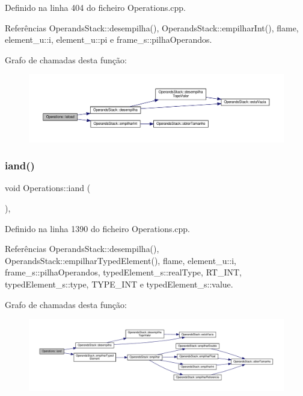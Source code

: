 Definido na linha 404 do ficheiro Operations.\+cpp.



Referências Operands\+Stack\+::desempilha(), Operands\+Stack\+::empilhar\+Int(), flame, element\+\_\+u\+::i, element\+\_\+u\+::pi e frame\+\_\+s\+::pilha\+Operandos.

Grafo de chamadas desta função\+:
\nopagebreak
\begin{figure}[H]
\begin{center}
\leavevmode
\includegraphics[width=350pt]{classOperations_a77f3b4c161fee7fbd6bb89b170400c0c_cgraph}
\end{center}
\end{figure}
\mbox{\label{classOperations_a8761c078ea80677ea82a43ab278e76b5}} 
\subsubsection{\texorpdfstring{iand()}{iand()}}
{\footnotesize\ttfamily void Operations\+::iand (\begin{DoxyParamCaption}{ }\end{DoxyParamCaption})\hspace{0.3cm}{\ttfamily [static]}, {\ttfamily [private]}}



Definido na linha 1390 do ficheiro Operations.\+cpp.



Referências Operands\+Stack\+::desempilha(), Operands\+Stack\+::empilhar\+Typed\+Element(), flame, element\+\_\+u\+::i, frame\+\_\+s\+::pilha\+Operandos, typed\+Element\+\_\+s\+::real\+Type, R\+T\+\_\+\+I\+NT, typed\+Element\+\_\+s\+::type, T\+Y\+P\+E\+\_\+\+I\+NT e typed\+Element\+\_\+s\+::value.

Grafo de chamadas desta função\+:
\nopagebreak
\begin{figure}[H]
\begin{center}
\leavevmode
\includegraphics[width=350pt]{classOperations_a8761c078ea80677ea82a43ab278e76b5_cgraph}
\end{center}
\end{figure}
\mbox{\label{classOperations_aeec162356a6792b1d0ba385f75f443b1}} 
